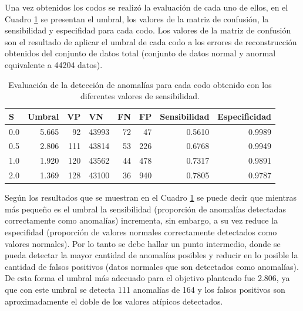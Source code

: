Una vez obtenidos los codos se realiz\'{o} la evaluaci\'{o}n de cada uno de ellos, en el Cuadro \ref{table:evaluacion_codos} se presentan el umbral, los valores de la matriz de confusi\'{o}n, la sensibilidad y especifidad para cada codo. Los valores de la matriz de confusi\'{o}n son el resultado de aplicar el umbral de cada codo a los errores de reconstrucci\'{o}n obtenidos del conjunto de datos total (conjunto de datos normal y anormal equivalente a 44204 datos).

\begin{table}[H]
\centering
\begin{center}
\begin{tabular}{|l|r|r|r|r|r|r|r|}
\hline
\textbf{S} & \multicolumn{1}{l|}{\textbf{Umbral}} & \multicolumn{1}{l|}{\textbf{VP}} & \multicolumn{1}{l|}{\textbf{VN}}& \multicolumn{1}{l|}{\textbf{FN}}& \multicolumn{1}{l|}{\textbf{FP}} & \multicolumn{1}{l|}{\textbf{Sensibilidad}} & \multicolumn{1}{l|}{\textbf{Especificidad}} \\ \hline
0.0 & 5.665 & \cellcolor[HTML]{AADD99} 92 & \cellcolor[HTML]{AADD99} 43993 & \cellcolor[HTML]{FFCE93} 72 & \cellcolor[HTML]{FFCE93} 47 & 0.5610 & 0.9989 \\ \hline
0.5  & 2.806 & \cellcolor[HTML]{AADD99} 111 & \cellcolor[HTML]{AADD99} 43814 & \cellcolor[HTML]{FFCE93} 53 & \cellcolor[HTML]{FFCE93} 226 & 0.6768 & 0.9949 \\ \hline
1.0 &  1.920 & \cellcolor[HTML]{AADD99} 120 & \cellcolor[HTML]{AADD99} 43562 & \cellcolor[HTML]{FFCE93} 44 & \cellcolor[HTML]{FFCE93} 478 & 0.7317 & 0.9891 \\ \hline
2.0 & 1.369	 & \cellcolor[HTML]{AADD99} 128 & \cellcolor[HTML]{AADD99} 43100  & \cellcolor[HTML]{FFCE93} 36 & \cellcolor[HTML]{FFCE93} 940 & 0.7805 & 0.9787 \\ \hline
\end{tabular}
\end{center}
\caption{Evaluaci\'{o}n de la detecci\'{o}n de anomal\'{i}as para cada codo obtenido con los diferentes valores de sensibilidad.}
\label{table:evaluacion_codos}
\end{table}

Seg\'{u}n los resultados que se muestran en el Cuadro \ref{table:evaluacion_codos} se puede decir que mientras m\'{a}s peque\~{n}o es el umbral la sensibilidad (proporci\'{o}n de anomal\'{i}as detectadas correctamente como anomal\'{i}as) incrementa, sin embargo, a su vez reduce la especifidad (proporci\'{o}n de valores normales correctamente detectados como valores normales). Por lo tanto se debe hallar un punto intermedio, donde se pueda detectar la mayor cantidad de anomal\'{i}as posibles y reducir en lo posible la cantidad de falsos positivos (datos normales que son detectados como anomal\'{i}as). De esta forma el umbral m\'{a}s adecuado para el objetivo planteado fue 2.806, ya que con este umbral se detecta 111 anomal\'{i}as de 164 y los falsos positivos son aproximadamente el doble de los valores at\'{i}picos detectados. 

